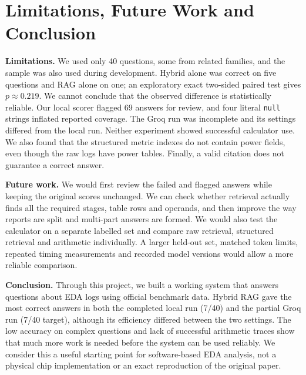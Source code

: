 \documentclass[11pt,a4paper]{article}
\newcommand{\code}[1]{\texttt{#1}}
\begin{document}
\section{Limitations, Future Work and Conclusion}
\textbf{Limitations.} We used only 40 questions, some from related families, and the sample was also used during development. Hybrid alone was correct on five questions and RAG alone on one; an exploratory exact two-sided paired test gives $p\approx0.219$. We cannot conclude that the observed difference is statistically reliable. Our local scorer flagged 69 answers for review, and four literal \code{null} strings inflated reported coverage. The Groq run was incomplete and its settings differed from the local run. Neither experiment showed successful calculator use. We also found that the structured metric indexes do not contain power fields, even though the raw logs have power tables. Finally, a valid citation does not guarantee a correct answer.

\textbf{Future work.} We would first review the failed and flagged answers while keeping the original scores unchanged. We can check whether retrieval actually finds all the required stages, table rows and operands, and then improve the way reports are split and multi-part answers are formed. We would also test the calculator on a separate labelled set and compare raw retrieval, structured retrieval and arithmetic individually. A larger held-out set, matched token limits, repeated timing measurements and recorded model versions would allow a more reliable comparison.

\textbf{Conclusion.} Through this project, we built a working system that answers questions about EDA logs using official benchmark data. Hybrid RAG gave the most correct answers in both the completed local run (7/40) and the partial Groq run (7/40 target), although its efficiency differed between the two settings. The low accuracy on complex questions and lack of successful arithmetic traces show that much more work is needed before the system can be used reliably. We consider this a useful starting point for software-based EDA analysis, not a physical chip implementation or an exact reproduction of the original paper.

\begingroup\small\setlength{\bibsep}{1.5pt}\endgroup
\end{document}
